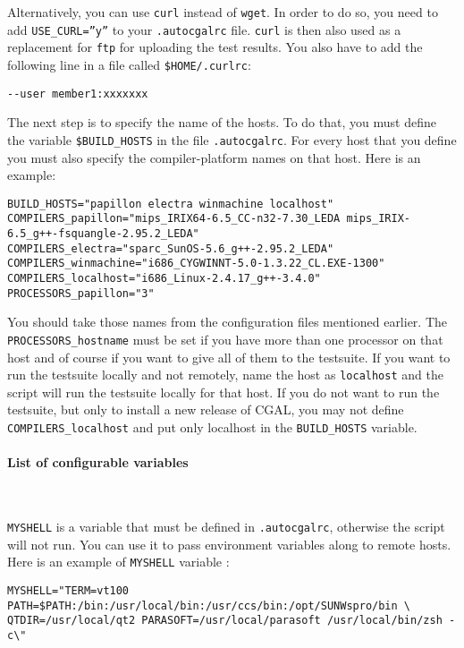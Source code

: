 Alternatively, you can use {\tt curl} instead of {\tt wget}.  In order to
do so, you need to add {\tt USE\_CURL=''y''} to your {\tt .autocgalrc} file.
{\tt curl} is then also used as a replacement for {\tt ftp} for uploading the
test results.
You also have to add the following line in a file called {\tt \$HOME/.curlrc}:
\begin{verbatim}
--user member1:xxxxxxx
\end{verbatim}

The next step is to specify the name of the hosts. To do that, you must define
the variable {\tt \$BUILD\_HOSTS} in the file {\tt .autocgalrc}. For every
host that you define you must also specify the compiler-platform names on that
host.  Here is an example:
{\small\begin{verbatim}
BUILD_HOSTS="papillon electra winmachine localhost"
COMPILERS_papillon="mips_IRIX64-6.5_CC-n32-7.30_LEDA mips_IRIX-6.5_g++-fsquangle-2.95.2_LEDA"
COMPILERS_electra="sparc_SunOS-5.6_g++-2.95.2_LEDA"
COMPILERS_winmachine="i686_CYGWINNT-5.0-1.3.22_CL.EXE-1300"
COMPILERS_localhost="i686_Linux-2.4.17_g++-3.4.0"
PROCESSORS_papillon="3"
\end{verbatim}}
You should take those names from the configuration files mentioned earlier.
The {\tt PROCESSORS\_hostname} must be set if you have more than one 
processor on that host and of course if you want to give all of them to the 
testsuite. If you want to run the testsuite locally and not remotely, name the 
host as {\tt localhost} and the script will run the testsuite locally for that
host. If you do not want to run the testsuite, but only to install a new release of CGAL, you may not define {\tt COMPILERS\_localhost} and put only localhost in the {\tt BUILD\_HOSTS} variable.

\paragraph{List of configurable variables} ~

{\tt MYSHELL} is a variable that must be defined in {\tt .autocgalrc},
otherwise the script will not run.  You can use it to pass environment
variables along to remote hosts.  Here is an example of {\tt MYSHELL}
variable :
\begin{verbatim}
MYSHELL="TERM=vt100 PATH=$PATH:/bin:/usr/local/bin:/usr/ccs/bin:/opt/SUNWspro/bin \
QTDIR=/usr/local/qt2 PARASOFT=/usr/local/parasoft /usr/local/bin/zsh -c\"
\end{verbatim}

